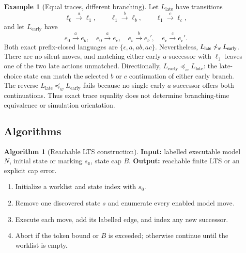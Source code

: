 \documentclass[JMCS,submit]{resources/ISRP}
\theoremstyle{definition}
\newtheorem{algorithm}[theorem]{Algorithm}
\newtheorem{example}[theorem]{Example}
\theoremstyle{remark}
\numberwithin{equation}{section}
\newcommand{\weaksim}{\mathrel{\sim_{w}}}
\newcommand{\weakpre}{\mathrel{\preceq_{w}}}
\begin{document}
\begin{example}[Equal traces, different branching]\label{ex:branching}
Let $L_{\mathrm{late}}$ have transitions
\begin{equation}\label{eq:late-choice}
 \ell_0\xrightarrow{a}\ell_1,\qquad
 \ell_1\xrightarrow{b}\ell_b,\qquad
 \ell_1\xrightarrow{c}\ell_c,
\end{equation}
and let $L_{\mathrm{early}}$ have
\begin{equation}\label{eq:early-choice}
 e_0\xrightarrow{a}e_b,\quad e_0\xrightarrow{a}e_c,\quad
 e_b\xrightarrow{b}e_b',\quad e_c\xrightarrow{c}e_c'.
\end{equation}
Both exact prefix-closed languages are
$\{\epsilon,a,ab,ac\}$. Nevertheless,
$L_{\mathrm{late}}\not\weaksim L_{\mathrm{early}}$. There are no silent moves,
and matching either early $a$-successor with $\ell_1$ leaves one of the two
late actions unmatched. Directionally,
$L_{\mathrm{early}}\weakpre L_{\mathrm{late}}$: the late-choice state can match
the selected $b$ or $c$ continuation of either early branch. The reverse
$L_{\mathrm{late}}\weakpre L_{\mathrm{early}}$ fails because no single early
$a$-successor offers both continuations. Thus exact trace equality does not
determine branching-time equivalence or simulation orientation.
\end{example}

\subsection{Algorithms}\label{sec:algorithms}

\begin{algorithm}[Reachable LTS construction]\label{alg:reachability}
\textbf{Input:} labelled executable model $N$, initial state or marking $s_0$,
state cap $B$. \textbf{Output:} reachable finite LTS or an explicit cap error.
\begin{enumerate}
\item Initialize a worklist and state index with $s_0$.
\item Remove one discovered state $s$ and enumerate every enabled model move.
\item Execute each move, add its labelled edge, and index any new successor.
\item Abort if the token bound or $B$ is exceeded; otherwise continue until the
worklist is empty.
\end{enumerate}
\end{algorithm}
\end{document}
